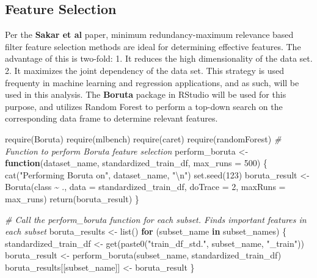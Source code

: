 \documentclass[
]{article}
\newenvironment{Shaded}{\begin{snugshade}}{\end{snugshade}}
\newcommand{\AttributeTok}[1]{\textcolor[rgb]{0.77,0.63,0.00}{#1}}
\newcommand{\CommentTok}[1]{\textcolor[rgb]{0.56,0.35,0.01}{\textit{#1}}}
\newcommand{\ControlFlowTok}[1]{\textcolor[rgb]{0.13,0.29,0.53}{\textbf{#1}}}
\newcommand{\DecValTok}[1]{\textcolor[rgb]{0.00,0.00,0.81}{#1}}
\newcommand{\FunctionTok}[1]{\textcolor[rgb]{0.00,0.00,0.00}{#1}}
\newcommand{\NormalTok}[1]{#1}
\newcommand{\OtherTok}[1]{\textcolor[rgb]{0.56,0.35,0.01}{#1}}
\newcommand{\SpecialCharTok}[1]{\textcolor[rgb]{0.00,0.00,0.00}{#1}}
\newcommand{\StringTok}[1]{\textcolor[rgb]{0.31,0.60,0.02}{#1}}
\begin{document}
\newpage

\hypertarget{feature-selection}{%
\subsection{Feature Selection}\label{feature-selection}}

Per the \textbf{Sakar et al} paper, minimum redundancy-maximum relevance based filter feature selection methods are ideal for determining effective features. The advantage of this is two-fold:
1. It reduces the high dimensionality of the data set.
2. It maximizes the joint dependency of the data set.
This strategy is used frequenty in machine learning and regression applications, and as such, will be used in this analysis. The \textbf{Boruta} package in RStudio will be used for this purpose, and utilizes Random Forest to perform a top-down search on the corresponding data frame to determine relevant features.

\begin{Shaded}
\begin{Highlighting}[]
\FunctionTok{require}\NormalTok{(Boruta)}
\FunctionTok{require}\NormalTok{(mlbench)}
\FunctionTok{require}\NormalTok{(caret)}
\FunctionTok{require}\NormalTok{(randomForest)}
\CommentTok{\# Function to perform Boruta feature selection}
\NormalTok{perform\_boruta }\OtherTok{\textless{}{-}} \ControlFlowTok{function}\NormalTok{(dataset\_name, standardized\_train\_df, }\AttributeTok{max\_runs =} \DecValTok{500}\NormalTok{) \{}
  \FunctionTok{cat}\NormalTok{(}\StringTok{"Performing Boruta on"}\NormalTok{, dataset\_name, }\StringTok{"}\SpecialCharTok{\textbackslash{}n}\StringTok{"}\NormalTok{)}
  \FunctionTok{set.seed}\NormalTok{(}\DecValTok{123}\NormalTok{)}
\NormalTok{  boruta\_result }\OtherTok{\textless{}{-}} \FunctionTok{Boruta}\NormalTok{(class }\SpecialCharTok{\textasciitilde{}}\NormalTok{ ., }\AttributeTok{data =}\NormalTok{ standardized\_train\_df, }\AttributeTok{doTrace =} \DecValTok{2}\NormalTok{, }\AttributeTok{maxRuns =}\NormalTok{ max\_runs)}
  \FunctionTok{return}\NormalTok{(boruta\_result)}
\NormalTok{\}}

\CommentTok{\# Call the perform\_boruta function for each subset. Finds important features in each subset}
\NormalTok{boruta\_results }\OtherTok{\textless{}{-}} \FunctionTok{list}\NormalTok{()}
\ControlFlowTok{for}\NormalTok{ (subset\_name }\ControlFlowTok{in}\NormalTok{ subset\_names) \{}
\NormalTok{  standardized\_train\_df }\OtherTok{\textless{}{-}} \FunctionTok{get}\NormalTok{(}\FunctionTok{paste0}\NormalTok{(}\StringTok{"train\_df\_std."}\NormalTok{, subset\_name, }\StringTok{"\_train"}\NormalTok{))}
\NormalTok{  boruta\_result }\OtherTok{\textless{}{-}} \FunctionTok{perform\_boruta}\NormalTok{(subset\_name, standardized\_train\_df)}
\NormalTok{  boruta\_results[[subset\_name]] }\OtherTok{\textless{}{-}}\NormalTok{ boruta\_result}
\NormalTok{\}}
\end{Highlighting}
\end{Shaded}
\end{document}
